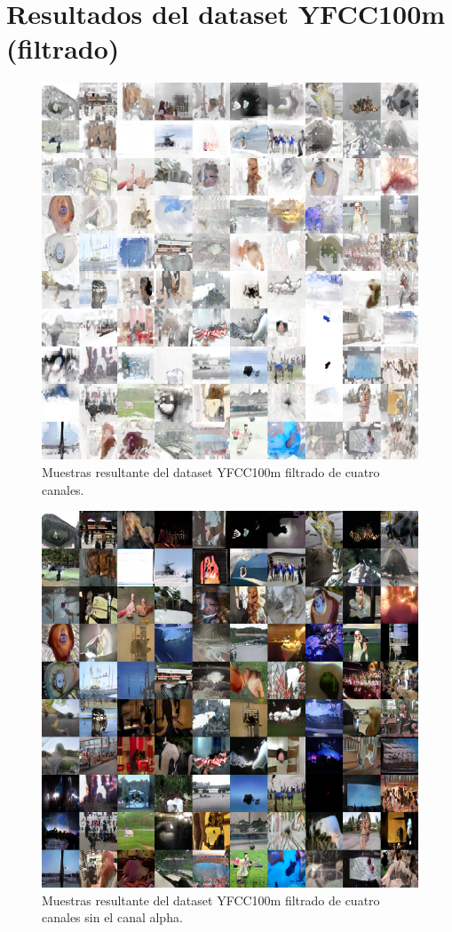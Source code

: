 \documentclass[spanish]{report}
\begin{document}
\chapter{Resultados del dataset YFCC100m (filtrado)}\label{apendice:filtrado}
\begin{figure}[H]
\centering
 \includegraphics[width=\linewidth]{resultados/filtered_4chan_normal.png}
   \caption{Muestras resultante del dataset YFCC100m filtrado de cuatro canales.}
  \label{fig:resultado_filtrado1}
\end{figure}

\begin{figure}[h]
\centering
 \includegraphics[width=\linewidth]{resultados/filtered_4chan_noalpha.png}
   \caption{Muestras resultante del dataset YFCC100m filtrado de cuatro canales sin el canal alpha.}
  \label{fig:resultado_filtrado2}
\end{figure}
\end{document}
